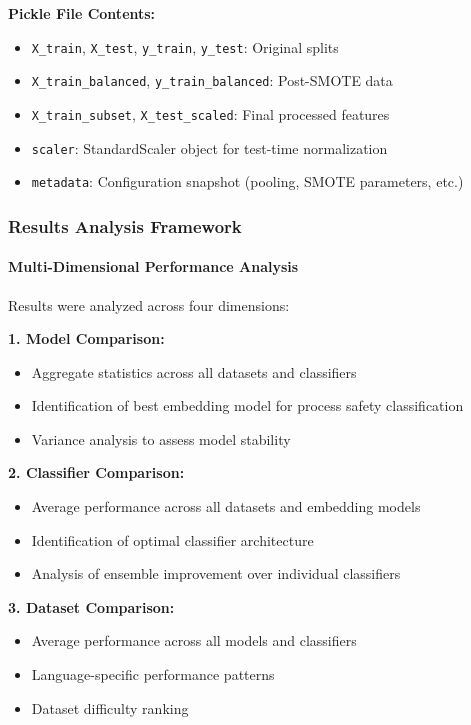 \documentclass[11pt, titlepage, bibliography=totoc]{scrreprt}
\begin{document}
\textbf{Pickle File Contents:}
\begin{itemize}
    \item \texttt{X\_train}, \texttt{X\_test}, \texttt{y\_train}, \texttt{y\_test}: Original splits
    \item \texttt{X\_train\_balanced}, \texttt{y\_train\_balanced}: Post-SMOTE data
    \item \texttt{X\_train\_subset}, \texttt{X\_test\_scaled}: Final processed features
    \item \texttt{scaler}: StandardScaler object for test-time normalization
    \item \texttt{metadata}: Configuration snapshot (pooling, SMOTE parameters, etc.)
\end{itemize}

\subsubsection{Results Analysis Framework}

\paragraph{Multi-Dimensional Performance Analysis}
Results were analyzed across four dimensions:

\textbf{1. Model Comparison:}
\begin{itemize}
    \item Aggregate statistics across all datasets and classifiers
    \item Identification of best embedding model for process safety classification
    \item Variance analysis to assess model stability
\end{itemize}

\textbf{2. Classifier Comparison:}
\begin{itemize}
    \item Average performance across all datasets and embedding models
    \item Identification of optimal classifier architecture
    \item Analysis of ensemble improvement over individual classifiers
\end{itemize}

\textbf{3. Dataset Comparison:}
\begin{itemize}
    \item Average performance across all models and classifiers
    \item Language-specific performance patterns
    \item Dataset difficulty ranking
\end{itemize}
\end{document}
